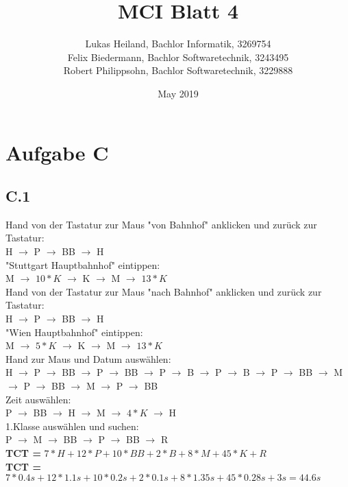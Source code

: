 \documentclass{article}
\title{MCI Blatt 4}
\author{Lukas Heiland, Bachlor Informatik, 3269754\\ Felix Biedermann, Bachlor Softwaretechnik, 3243495\\ Robert Philippsohn, Bachlor Softwaretechnik, 3229888 }
\date{May 2019}
\begin{document}
\maketitle

\section*{Aufgabe C}
    \subsection*{C.1}
        Hand von der Tastatur zur Maus "von Bahnhof" anklicken und zurück zur Tastatur:\\
        H $\rightarrow$ P $\rightarrow$ BB $\rightarrow$ H\\
        "Stuttgart Hauptbahnhof" eintippen:\\
        M $\rightarrow$ $10*K$ $\rightarrow$ K $\rightarrow$ M $\rightarrow$ $13*K$\\
        Hand von der Tastatur zur Maus "nach Bahnhof" anklicken und zurück zur Tastatur:\\
        H $\rightarrow$ P $\rightarrow$ BB $\rightarrow$ H\\
        "Wien Hauptbahnhof" eintippen:\\
        M $\rightarrow$ $5*K$ $\rightarrow$ K $\rightarrow$ M $\rightarrow$ $13*K$\\
       	Hand zur Maus und Datum auswählen:\\
       	H $\rightarrow$ P $\rightarrow$ BB $\rightarrow$ P $\rightarrow$ BB $\rightarrow$ P $\rightarrow$ B $\rightarrow$ P $\rightarrow$ B $\rightarrow$ P $\rightarrow$ BB $\rightarrow$ M $\rightarrow$ P $\rightarrow$ BB $\rightarrow$ M $\rightarrow$ P $\rightarrow$ BB\\
       	Zeit auswählen:\\
       	P $\rightarrow$ BB $\rightarrow$ H $\rightarrow$ M $\rightarrow$ $4*K$ $\rightarrow$ H\\
       	1.Klasse auswählen und suchen:\\
       	P $\rightarrow$ M $\rightarrow$ BB $\rightarrow$ P $\rightarrow$ BB $\rightarrow$ R\\
       	
       	\textbf{TCT =} $7*H + 12*P + 10*BB + 2*B + 8*M + 45*K + R$\\
       	\hspace*{5.5mm}\textbf{TCT =} $7*0.4s + 12*1.1s + 10*0.2s + 2*0.1s + 8*1.35s + 45*0.28s + 3s = 44.6s $
\end{document}
